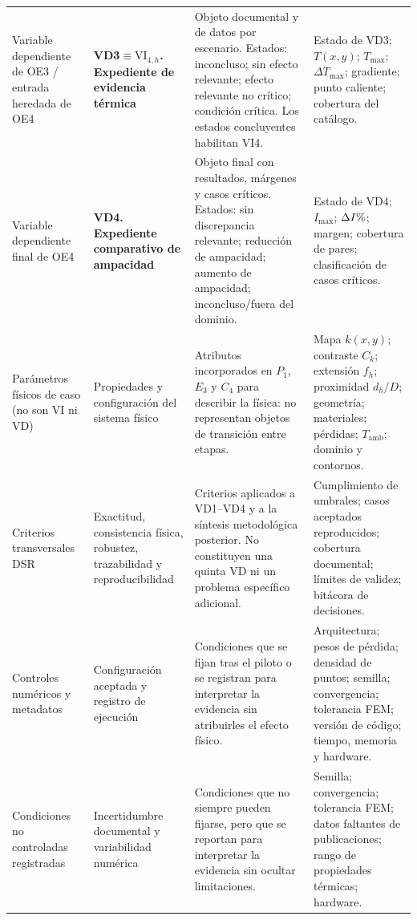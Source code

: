 \documentclass[11pt,a4paper,oneside]{report}
\newcommand{\Tmax}{T_{\max}}
\newcommand{\Imax}{I_{\max}}
\newcommand{\kx}{k(x,y)}
\newcommand{\pct}{\mbox{\char37}}
\begin{document}
\begin{singlespace}
\begin{landscape}
\begin{longtable}{L{4.00cm}L{4.20cm}L{8.20cm}L{6.30cm}}
Variable dependiente de OE3 / entrada heredada de OE4 & \textbf{VD3$\equiv\mathrm{VI}_{4,h}$. Expediente de evidencia térmica} & Objeto documental y de datos por escenario. Estados: inconcluso; sin efecto relevante; efecto relevante no crítico; condición crítica. Los estados concluyentes habilitan VI4. & Estado de VD3; $T(x,y)$; $\Tmax$; $\Delta\Tmax$; gradiente; punto caliente; cobertura del catálogo. \\

Variable dependiente final de OE4 & \textbf{VD4. Expediente comparativo de ampacidad} & Objeto final con resultados, márgenes y casos críticos. Estados: sin discrepancia relevante; reducción de ampacidad; aumento de ampacidad; inconcluso/fuera del dominio. & Estado de VD4; $\Imax$; $\Delta I\pct$; margen; cobertura de pares; clasificación de casos críticos. \\

Parámetros físicos de caso (no son VI ni VD) & Propiedades y configuración del sistema físico & Atributos incorporados en $P_1$, $E_3$ y $C_4$ para describir la física: no representan objetos de transición entre etapas. & Mapa $\kx$; contraste $C_k$; extensión $f_h$; proximidad $d_h/D$; geometría; materiales; pérdidas; $T_{\mathrm{amb}}$; dominio y contornos. \\

Criterios transversales DSR & Exactitud, consistencia física, robustez, trazabilidad y reproducibilidad & Criterios aplicados a VD1--VD4 y a la síntesis metodológica posterior. No constituyen una quinta VD ni un problema específico adicional. & Cumplimiento de umbrales; casos aceptados reproducidos; cobertura documental; límites de validez; bitácora de decisiones. \\

Controles numéricos y metadatos & Configuración aceptada y registro de ejecución & Condiciones que se fijan tras el piloto o se registran para interpretar la evidencia sin atribuirles el efecto físico. & Arquitectura; pesos de pérdida; densidad de puntos; semilla; convergencia; tolerancia FEM; versión de código; tiempo, memoria y hardware. \\

Condiciones no controladas registradas & Incertidumbre documental y variabilidad numérica & Condiciones que no siempre pueden fijarse, pero que se reportan para interpretar la evidencia sin ocultar limitaciones. & Semilla; convergencia; tolerancia FEM; datos faltantes de publicaciones; rango de propiedades térmicas; hardware. \\


\end{longtable}
\end{landscape}
\end{singlespace}
\end{document}
